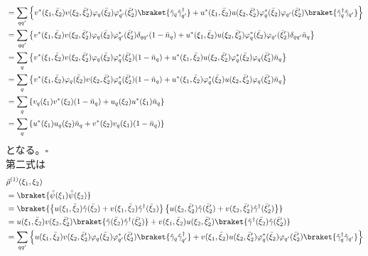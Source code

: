 \documentclass[dvipdfmx, 11pt, a4paper]{jsarticle}
\numberwithin{equation}{section}
\theoremstyle{definition}
\begin{document}
\begin{derivationBox}
\begin{align}
            &= \sum_{qq'} \left\{ v^*(\xi_1,\bar{\xi}_2) v(\xi_2,\bar{\xi}_2')\varphi_q(\bar{\xi}_2)\varphi_{q'}^*(\bar{\xi}_2')\braket{ \hat{\gamma}_q\hat{\gamma}^\dagger_{q'}} + u^*(\xi_1,\bar{\xi}_2)u(\xi_2,\bar{\xi}_2')\varphi_q^*(\bar{\xi}_2)\varphi_{q'}(\bar{\xi}_2')\braket{\hat{\gamma}^\dagger_q \hat{\gamma}_{q'}} \right\} \notag \\
            &= \sum_{qq'} \left\{ v^*(\xi_1,\bar{\xi}_2) v(\xi_2,\bar{\xi}_2')\varphi_q(\bar{\xi}_2)\varphi_{q'}^*(\bar{\xi}_2')\delta_{qq'}(1-\bar{n}_q) + u^*(\xi_1,\bar{\xi}_2)u(\xi_2,\bar{\xi}_2')\varphi_q^*(\bar{\xi}_2)\varphi_{q'}(\bar{\xi}_2')\delta_{qq'}\bar{n}_q \right\} \notag \\
            &= \sum_{q} \left\{ v^*(\xi_1,\bar{\xi}_2) v(\xi_2,\bar{\xi}_2')\varphi_q(\bar{\xi}_2)\varphi_{q}^*(\bar{\xi}_2')(1-\bar{n}_q) + u^*(\xi_1,\bar{\xi}_2)u(\xi_2,\bar{\xi}_2')\varphi_q^*(\bar{\xi}_2)\varphi_{q}(\bar{\xi}_2')\bar{n}_q \right\}  \notag \\
            &= \sum_{q} \left\{ v^*(\xi_1,\bar{\xi}_2) \varphi_q(\bar{\xi}_2)v(\xi_2,\bar{\xi}_2')\varphi_{q}^*(\bar{\xi}_2')(1-\bar{n}_q) + u^*(\xi_1,\bar{\xi}_2)\varphi_q^*(\bar{\xi}_2)u(\xi_2,\bar{\xi}_2')\varphi_{q}(\bar{\xi}_2')\bar{n}_q \right\} \notag \\
            &= \sum_q\left\{ v_q(\xi_1) v^*(\xi_2)(1-\bar{n}_q) + u_q(\xi_2)u^*(\xi_1)\bar{n}_q \right\} \notag \\
            &= \sum_q\left\{ u^*(\xi_1)u_q(\xi_2)\bar{n}_q +  v^*(\xi_2)v_q(\xi_1) (1-\bar{n}_q)  \right\}
        \end{align}
        となる。$\square$\\
        第二式は
        \begin{align}
            &\tilde{\rho}^{(1)}(\xi_1,\xi_2) \notag \\
            &= \braket{\hat{\psi}(\xi_1)\hat{\psi}(\xi_2)} \notag \\
            &= \braket{\left\{ u(\xi_1,\bar{\xi}_2)\hat{\gamma}(\bar{\xi}_2) + v(\xi_1,\bar{\xi}_2)\hat{\gamma}^\dagger(\bar{\xi}_2)  \right\} \left\{ u(\xi_2,\bar{\xi}_2')\hat{\gamma}(\bar{\xi}_2') + v(\xi_2,\bar{\xi}_2')\hat{\gamma}^\dagger(\bar{\xi}_2')  \right\}} \notag \\
            &= u(\xi_1,\bar{\xi}_2)v(\xi_2,\bar{\xi}_2')\braket{\hat{\gamma}(\bar{\xi}_2)\hat{\gamma}^\dagger(\bar{\xi}_2')} + v(\xi_1,\bar{\xi}_2) u(\xi_2,\bar{\xi}_2')\braket{\hat{\gamma}^\dagger(\bar{\xi}_2)\hat{\gamma}(\bar{\xi}_2')} \notag \\
            &=\sum_{qq'} \left\{ u(\xi_1,\bar{\xi}_2)v(\xi_2,\bar{\xi}_2')\varphi_q (\bar{\xi}_2)\varphi_{q'}^*(\bar{\xi}_2')\braket{\hat{\gamma}_q\hat{\gamma}^\dagger_{q'}} + v(\xi_1,\bar{\xi}_2) u(\xi_2,\bar{\xi}_2')\varphi_q^*(\bar{\xi}_2)\varphi_{q'}(\bar{\xi}_2')\braket{\hat{\gamma}^\dagger_q\hat{\gamma}_{q'}} \right\} \notag \\

\end{align}
\end{derivationBox}
\end{document}
